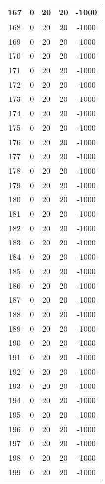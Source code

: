 \documentclass[letterpaper, 12pt]{article}
\begin{document}
\begin{longtable}{|c|c|c|c|c|}
\hline
167 & 0 & 20 & 20 & -1000 \\
\hline
168 & 0 & 20 & 20 & -1000 \\
\hline
169 & 0 & 20 & 20 & -1000 \\
\hline
170 & 0 & 20 & 20 & -1000 \\
\hline
171 & 0 & 20 & 20 & -1000 \\
\hline
172 & 0 & 20 & 20 & -1000 \\
\hline
173 & 0 & 20 & 20 & -1000 \\
\hline
174 & 0 & 20 & 20 & -1000 \\
\hline
175 & 0 & 20 & 20 & -1000 \\
\hline
176 & 0 & 20 & 20 & -1000 \\
\hline
177 & 0 & 20 & 20 & -1000 \\
\hline
178 & 0 & 20 & 20 & -1000 \\
\hline
179 & 0 & 20 & 20 & -1000 \\
\hline
180 & 0 & 20 & 20 & -1000 \\
\hline
181 & 0 & 20 & 20 & -1000 \\
\hline
182 & 0 & 20 & 20 & -1000 \\
\hline
183 & 0 & 20 & 20 & -1000 \\
\hline
184 & 0 & 20 & 20 & -1000 \\
\hline
185 & 0 & 20 & 20 & -1000 \\
\hline
186 & 0 & 20 & 20 & -1000 \\
\hline
187 & 0 & 20 & 20 & -1000 \\
\hline
188 & 0 & 20 & 20 & -1000 \\
\hline
189 & 0 & 20 & 20 & -1000 \\
\hline
190 & 0 & 20 & 20 & -1000 \\
\hline
191 & 0 & 20 & 20 & -1000 \\
\hline
192 & 0 & 20 & 20 & -1000 \\
\hline
193 & 0 & 20 & 20 & -1000 \\
\hline
194 & 0 & 20 & 20 & -1000 \\
\hline
195 & 0 & 20 & 20 & -1000 \\
\hline
196 & 0 & 20 & 20 & -1000 \\
\hline
197 & 0 & 20 & 20 & -1000 \\
\hline
198 & 0 & 20 & 20 & -1000 \\
\hline
199 & 0 & 20 & 20 & -1000 \\
\hline
\end{longtable}
\end{document}
